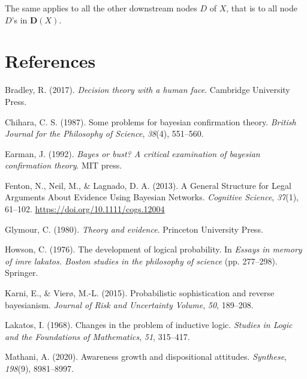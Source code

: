 \documentclass[
  11pt,
  dvipsnames,enabledeprecatedfontcommands]{scrartcl}
\newlength{\cslhangindent}
\newlength{\cslentryspacingunit} %
\newenvironment{CSLReferences}[2] %
 {%
  \setlength{\parindent}{0pt}
  \ifodd #1
  \let\oldpar\par
  \def\par{\hangindent=\cslhangindent\oldpar}
  \fi
  \setlength{\parskip}{#2\cslentryspacingunit}
 }%
 {}
\begin{document}
The same applies to all the other downstream nodes \(D\) of \(X\), that
is to all node \(D\)'s in \(\mathbf{D}(X)\).

\singlespace

\hypertarget{references}{%
\section*{References}\label{references}}

\hypertarget{refs}{}
\begin{CSLReferences}{1}{0}
\leavevmode{}%
Bradley, R. (2017). \emph{Decision theory with a human face}. Cambridge
University Press.

\leavevmode{}%
Chihara, C. S. (1987). Some problems for bayesian confirmation theory.
\emph{British Journal for the Philosophy of Science}, \emph{38}(4),
551--560.

\leavevmode{}%
Earman, J. (1992). \emph{Bayes or bust? A critical examination of
bayesian confirmation theory}. MIT press.

\leavevmode{}%
Fenton, N., Neil, M., \& Lagnado, D. A. (2013). A {General Structure}
for {Legal Arguments About Evidence Using Bayesian Networks}.
\emph{Cognitive Science}, \emph{37}(1), 61--102.
\url{https://doi.org/10.1111/cogs.12004}

\leavevmode{}%
Glymour, C. (1980). \emph{Theory and evidence}. Princeton University
Press.

\leavevmode{}%
Howson, C. (1976). The development of logical probability. In
\emph{Essays in memory of imre lakatos. Boston studies in the philosophy
of science} (pp. 277--298). Springer.

\leavevmode{}%
Karni, E., \& Vierø, M.-L. (2015). Probabilistic sophistication and
reverse bayesianism. \emph{Journal of Risk and Uncertainty Volume},
\emph{50}, 189--208.

\leavevmode{}%
Lakatos, I. (1968). Changes in the problem of inductive logic.
\emph{Studies in Logic and the Foundations of Mathematics}, \emph{51},
315--417.

\leavevmode{}%
Mathani, A. (2020). Awareness growth and dispositional attitudes.
\emph{Synthese}, \emph{198}(9), 8981--8997.


\end{CSLReferences}
\end{document}
